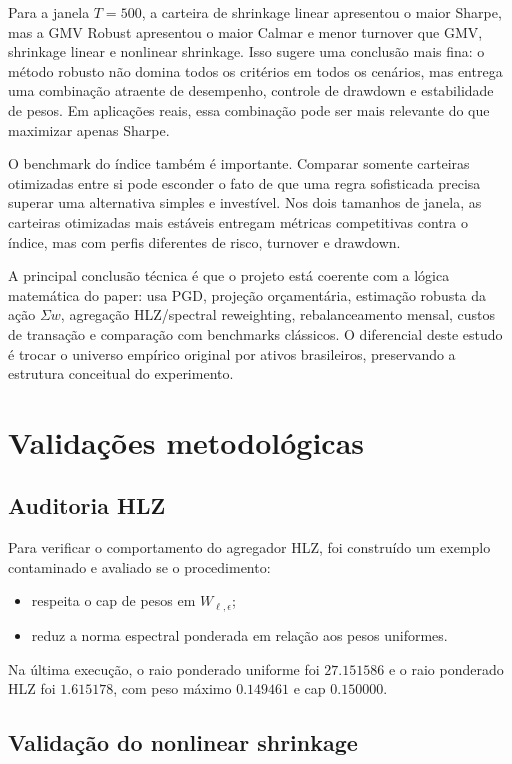 \documentclass[12pt,a4paper]{article}
\begin{document}
Para a janela $T=500$, a carteira de shrinkage linear apresentou o maior Sharpe, mas a GMV
Robust apresentou o maior Calmar e menor turnover que GMV, shrinkage linear e nonlinear
shrinkage. Isso sugere uma conclusão mais fina: o método robusto não domina todos os critérios
em todos os cenários, mas entrega uma combinação atraente de desempenho, controle de drawdown
e estabilidade de pesos. Em aplicações reais, essa combinação pode ser mais relevante do que
maximizar apenas Sharpe.

O benchmark do índice também é importante. Comparar somente carteiras otimizadas entre si
pode esconder o fato de que uma regra sofisticada precisa superar uma alternativa simples e
investível. Nos dois tamanhos de janela, as carteiras otimizadas mais estáveis entregam
métricas competitivas contra o índice, mas com perfis diferentes de risco, turnover e
drawdown.

A principal conclusão técnica é que o projeto está coerente com a lógica matemática do paper:
usa PGD, projeção orçamentária, estimação robusta da ação $\Sigma w$, agregação HLZ/spectral
reweighting, rebalanceamento mensal, custos de transação e comparação com benchmarks
clássicos. O diferencial deste estudo é trocar o universo empírico original por ativos
brasileiros, preservando a estrutura conceitual do experimento.

\section{Validações metodológicas}

\subsection{Auditoria HLZ}

Para verificar o comportamento do agregador HLZ, foi construído um exemplo contaminado e
avaliado se o procedimento:

\begin{itemize}[leftmargin=*]
  \item respeita o cap de pesos em $W_{\ell,\epsilon}$;
  \item reduz a norma espectral ponderada em relação aos pesos uniformes.
\end{itemize}

Na última execução, o raio ponderado uniforme foi $27.151586$ e o raio ponderado HLZ foi
$1.615178$, com peso máximo $0.149461$ e cap $0.150000$.

\subsection{Validação do nonlinear shrinkage}
\end{document}
